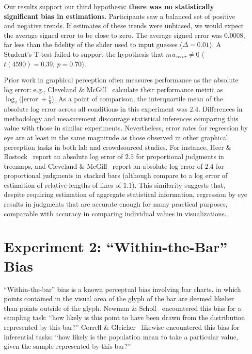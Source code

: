 \documentclass{sigchi}
\begin{document}
Our results support our third hypothesis: \textbf{there was no statistically significant bias in estimations}. Participants saw a balanced set of positive and negative trends. If estimates of these trends were unbiased, we would expect the average signed error to be close to zero. The average signed error was $0.0008$, far less than the fidelity of the slider used to input guesses ($\Delta=0.01$). A Student's T-test failed to support the hypothesis that $mu_{error}\ne0$ ($t(4590) = 0.39$, $p=0.70$).

Prior work in graphical perception often measures performance as the absolute log error: e.g., Cleveland \& McGill~\cite{cleveland1984graphical} calculate their performance metric as $\log_2 (|\text{error}| + \frac{1}{8}$). As a point of comparison, the interquartile mean of the absolute log error across all conditions in this experiment was $2.4$. Differences in methodology and measurement discourage statistical inferences comparing this value with those in similar experiments. Nevertheless, error rates for regression by eye are at least in the same magnitude as those observed in other graphical perception tasks in both lab and crowdsourced studies. For instance, Heer \& Bostock~\cite{heer2010crowdsourcing} report an absolute log error of $2.5$ for proportional judgments in treemaps, and Cleveland \& McGill~\cite{cleveland1984graphical} report an absolute log error of $2.4$ for proportional judgments in stacked bars (although compare to a log error of estimation of relative lengths of lines of $1.1$). This similarity suggests that, despite requiring estimation of aggregate statistical information, regression by eye results in judgments that are accurate enough for many practical purposes, comparable with accuracy in comparing individual values in visualizations. 

\section{Experiment 2: ``Within-the-Bar'' Bias}

\expTwoTypesFig

``Within-the-bar'' bias is a known perceptual bias involving bar charts, in which points contained in the visual area of the glyph of the bar are deemed likelier than points outside of the glyph. Newman \& Scholl~\cite{newman2012bar} encountered this bias for a sampling task: ``how likely is this point to have been drawn from the distribution represented by this bar?'' Correll \& Gleicher~\cite{correll2014error} likewise encountered this bias for inferential tasks: ``how likely is the population mean to take a particular value, given the sample represented by this bar?''
\end{document}
